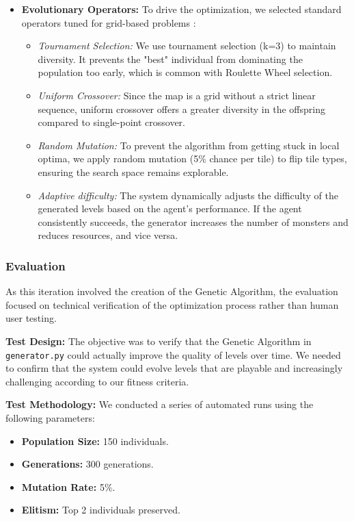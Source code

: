\begin{itemize}
    \item \textbf{Evolutionary Operators:}
    To drive the optimization, we selected standard operators tuned for grid-based problems \cite{Book_PCG}:
    \begin{itemize}
        \item \textit{Tournament Selection:} We use tournament selection (k=3) to maintain diversity. It prevents the "best" individual from dominating the population too early, which is common with Roulette Wheel selection.
        \item \textit{Uniform Crossover:} Since the map is a grid without a strict linear sequence, uniform crossover offers a greater diversity in the offspring compared to single-point crossover.
        \item \textit{Random Mutation:} To prevent the algorithm from getting stuck in local optima, we apply random mutation (5\% chance per tile) to flip tile types, ensuring the search space remains explorable.
        \item \textit{Adaptive difficulty:} The system dynamically adjusts the difficulty of the generated levels based on the agent's performance. If the agent consistently succeeds, the generator increases the number of monsters and reduces resources, and vice versa.
    \end{itemize}
\end{itemize}

\subsubsection{Evaluation}
As this iteration involved the creation of the Genetic Algorithm, the evaluation focused on technical verification of the optimization process rather than human user testing.

\textbf{Test Design:}
The objective was to verify that the Genetic Algorithm in \texttt{generator.py} could actually improve the quality of levels over time.
We needed to confirm that the system could evolve levels that are playable and increasingly challenging according to our fitness criteria.

\textbf{Test Methodology:}
We conducted a series of automated runs using the following parameters:
\begin{itemize}
    \item \textbf{Population Size:} 150 individuals.
    \item \textbf{Generations:} 300 generations.
    \item \textbf{Mutation Rate:} 5\%.
    \item \textbf{Elitism:} Top 2 individuals preserved.
\end{itemize}

